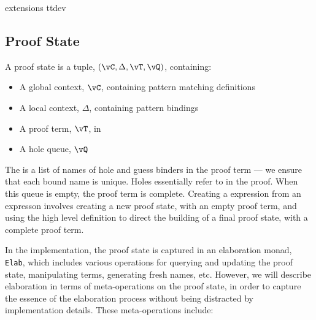 {\TTdev{} extensions}
{ttdev}


\subsection{Proof State}

A proof state is a tuple, $(\vC, \Delta, \vT, \vQ)$, containing:

\begin{itemize}
\item A global context, $\vC$, containing pattern matching definitions
\item A local context, $\Delta$, containing pattern bindings
\item A proof term, $\vT$, in \TTdev{}
\item A hole queue, $\vQ$
\end{itemize}

The  is a list of names of hole and guess binders in the proof term ---
we ensure that each bound name is unique. Holes essentially refer to 
in the proof.
When this queue is empty, the proof term is complete.
Creating a \TT{} expression from an \Idris{} expresson involves creating
a new proof state, with an empty proof term, and using the high level definition
to direct the building of a final proof state, with a complete proof term.

In the implementation, the proof state is captured in an elaboration monad,
\texttt{Elab}, which includes various operations for querying and updating
the proof state, manipulating terms, generating fresh names, etc. However, we will
describe \Idris{} elaboration in terms of meta-operations on the proof state,
in order to capture the essence of the elaboration process without being distracted
by implementation details. These meta-operations include: 

